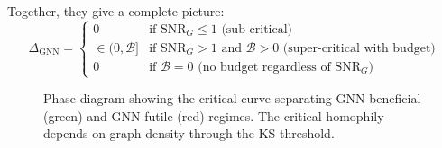 Together, they give a complete picture:
\begin{equation}
    \Delta_{\mathrm{GNN}} = \begin{cases}
        0 & \text{if } \mathrm{SNR}_G \leq 1 \text{ (sub-critical)} \\
        \in (0, \mathcal{B}] & \text{if } \mathrm{SNR}_G > 1 \text{ and } \mathcal{B} > 0 \text{ (super-critical with budget)} \\
        0 & \text{if } \mathcal{B} = 0 \text{ (no budget regardless of } \mathrm{SNR}_G)
    \end{cases}
\end{equation}

\begin{figure}[t]
\centering
\caption{Phase diagram showing the critical curve separating GNN-beneficial (green) and GNN-futile (red) regimes. The critical homophily depends on graph density through the KS threshold.}
\label{fig:phase_diagram}
\end{figure}


